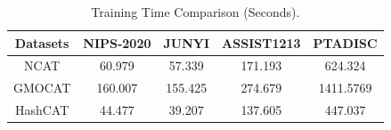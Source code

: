 \begin{table}[!t]
  \centering
   \caption{Training Time Comparison (Seconds).}
\vspace{-10pt}
  
    \begin{tabular}{ccccc}
    \hline
    \toprule
    \toprule
      Datasets\newline{} & \multicolumn{1}{c}{ NIPS-2020} & \multicolumn{1}{c}{JUNYI} & \multicolumn{1}{c}{ASSIST1213} & \multicolumn{1}{c}{PTADISC} \\
    \midrule
    NCAT  & 60.979 & 57.339 &171.193&  624.324\\
    GMOCAT &   160.007&  155.425 &  274.679   & 1411.5769 \\
    HashCAT & 44.477&39.207 & 137.605&447.037  \\
    \hline   
  
    \bottomrule
  
    
    \end{tabular}%
   
  \label{traintime}%
\end{table}%
